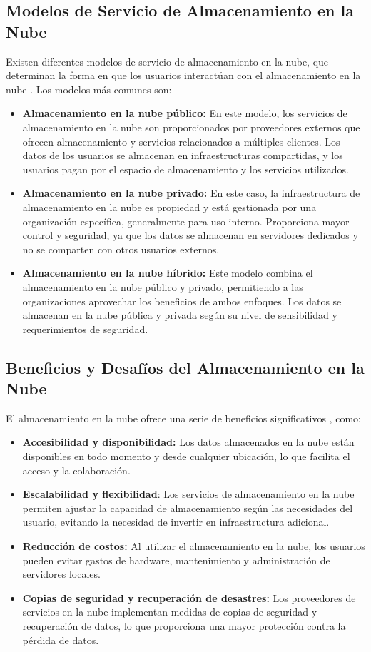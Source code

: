 \subsection{Modelos de Servicio de Almacenamiento en la Nube}
Existen diferentes modelos de servicio de almacenamiento en la nube, que determinan la forma en que los usuarios interactúan con el almacenamiento en la nube \cite{71}. Los modelos más comunes son:
\begin{itemize}
    \item \textbf{Almacenamiento en la nube público:} En este modelo, los servicios de almacenamiento en la nube son proporcionados por proveedores externos que ofrecen almacenamiento y servicios relacionados a múltiples clientes. Los datos de los usuarios se almacenan en infraestructuras compartidas, y los usuarios pagan por el espacio de almacenamiento y los servicios utilizados.
    \item \textbf{Almacenamiento en la nube privado:} En este caso, la infraestructura de almacenamiento en la nube es propiedad y está gestionada por una organización específica, generalmente para uso interno. Proporciona mayor control y seguridad, ya que los datos se almacenan en servidores dedicados y no se comparten con otros usuarios externos.
    \item \textbf{Almacenamiento en la nube híbrido:} Este modelo combina el almacenamiento en la nube público y privado, permitiendo a las organizaciones aprovechar los beneficios de ambos enfoques. Los datos se almacenan en la nube pública y privada según su nivel de sensibilidad y requerimientos de seguridad.
\end{itemize}

\subsection{Beneficios y Desafíos del Almacenamiento en la Nube}
El almacenamiento en la nube ofrece una serie de beneficios significativos \cite{72}, como:
\begin{itemize}
    \item \textbf{Accesibilidad y disponibilidad:} Los datos almacenados en la nube están disponibles en todo momento y desde cualquier ubicación, lo que facilita el acceso y la colaboración.
    \item \textbf{Escalabilidad y flexibilidad}: Los servicios de almacenamiento en la nube permiten ajustar la capacidad de almacenamiento según las necesidades del usuario, evitando la necesidad de invertir en infraestructura adicional.
    \item \textbf{Reducción de costos:} Al utilizar el almacenamiento en la nube, los usuarios pueden evitar gastos de hardware, mantenimiento y administración de servidores locales.
    \item \textbf{Copias de seguridad y recuperación de desastres: }Los proveedores de servicios en la nube implementan medidas de copias de seguridad y recuperación de datos, lo que proporciona una mayor protección contra la pérdida de datos.
\end{itemize}

